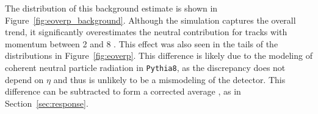 The distribution of this background estimate is shown in Figure~\ref{fig:eoverp_background}. 
Although the simulation captures the overall trend, it significantly overestimates the neutral contribution for tracks with momentum between 2 and 8 \GeV.
This effect was also seen in the tails of the \ep distributions in Figure~\ref{fig:eoverp}.
This difference is likely due to the modeling of coherent neutral particle radiation in \texttt{Pythia8}, as the discrepancy does not depend on $\eta$ and thus is unlikely to be a mismodeling of the detector.
This difference can be subtracted to form a corrected average \ep, as in Section~\ref{sec:response}.

\begin{figure}[htbp]
\centering
{}
~
\\
\end{figure}
